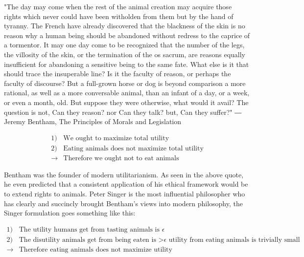 \documentclass[12pt]{report}
\numberwithin{equation}{section}
\begin{document}
\begin{tcolorbox}[enhanced,%
  colback=green!25!black!10!white,colframe=green!75!black,title=Principle of utility (10cm),
  drop fuzzy shadow,watermark color=white,watermark text=Fit]
"The day may come when the rest of the animal creation may acquire those
rights which never could have been witholden from them but by the hand of
tyranny. The French have already discovered that the blackness of the skin
is no reason why a human being should be abandoned without redress to the
caprice of a tormentor. It may one day come to be recognized that the
number of the legs, the villosity of the skin, or the termination of the os
sacrum, are reasons equally insufficient for abandoning a sensitive being to
the same fate. What else is it that should trace the insuperable line? Is it the
faculty of reason, or perhaps the faculty of discourse? But a full-grown
horse or dog is beyond comparison a more rational, as well as a more
conversable animal, than an infant of a day, or a week, or even a month,
old. But suppose they were otherwise, what would it avail? The question is
not, Can they reason? nor Can they talk? but, Can they suffer?"
― Jeremy Bentham, The Principles of Morals and Legislation
\end{tcolorbox}

\begin{tcolorbox}[enhanced,%
  colback=green!25!black!10!white,colframe=green!75!black,title=Fit box (5cm),
  drop fuzzy shadow,watermark color=white,watermark text=Fit]
\begin{align*}
1)& \text{We ought to maximize total utility} \\
2)& \text{Eating animals does not maximize total utility} \\
\rightarrow& \text{Therefore we ought not to eat animals}
\end{align*}
\end{tcolorbox}

Bentham was the founder of modern utilitarianism. As seen in the above quote, he even predicted that a consistent application of his ethical framework would be to extend rights to animals. Peter Singer is the most influential philosopher who has clearly and succincly brought Bentham's views into modern philosophy, the Singer formulation goes something like this: 

\begin{tcolorbox}[enhanced,%
  colback=green!25!black!10!white,colframe=green!75!black,title=Fit box (5cm),
  drop fuzzy shadow,watermark color=white,watermark text=Fit]
\begin{align*}
1)& \text{The utility humans get from tasting animals is $\epsilon$} \\
2)& \text{The disutility animals get from being eaten is >$\epsilon$ utility from eating animals is trivially small} \\
\rightarrow& \text{Therefore eating animals does not maximize utility}
\end{align*}
\end{tcolorbox}
\end{document}
